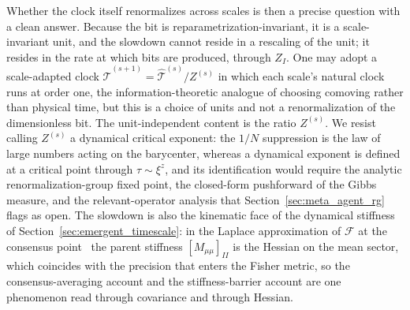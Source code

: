 Whether the clock itself renormalizes across scales is then a precise question with a clean answer. Because the bit is reparametrization-invariant, it is a scale-invariant unit, and the slowdown cannot reside in a rescaling of the unit; it resides in the rate at which bits are produced, through $Z_I$. One may adopt a scale-adapted clock $\hat{\mathcal{T}}^{(s+1)} = \hat{\mathcal{T}}^{(s)}/Z^{(s)}$ in which each scale's natural clock runs at order one, the information-theoretic analogue of choosing comoving rather than physical time, but this is a choice of units and not a renormalization of the dimensionless bit. The unit-independent content is the ratio $Z^{(s)}$. We resist calling $Z^{(s)}$ a dynamical critical exponent: the $1/N$ suppression is the law of large numbers acting on the barycenter, whereas a dynamical exponent is defined at a critical point through $\tau \sim \xi^z$, and its identification would require the analytic renormalization-group fixed point, the closed-form pushforward of the Gibbs measure, and the relevant-operator analysis that Section~\ref{sec:meta_agent_rg} flags as open. The slowdown is also the kinematic face of the dynamical stiffness of Section~\ref{sec:emergent_timescale}: in the Laplace approximation of $\mathcal{F}$ at the consensus point~\cite[\S2.2.2]{Beal2003} the parent stiffness $[M_{\mu\mu}]_{II}$ is the Hessian on the mean sector, which coincides with the precision that enters the Fisher metric, so the consensus-averaging account and the stiffness-barrier account are one phenomenon read through covariance and through Hessian.


%
%
%
%
